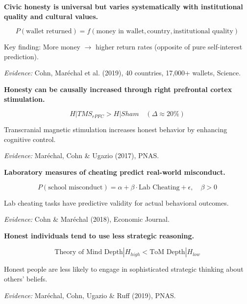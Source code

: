 \begin{tcolorbox}[colback=red!5!white,colframe=red!75!black,title=Axiom MM-3: Civic Honesty Universality with Variation]
\textbf{Civic honesty is universal but varies systematically with institutional quality and cultural values.}

\begin{equation}
P(\text{wallet returned}) = f(\text{money in wallet}, \text{country}, \text{institutional quality})
\end{equation}

Key finding: More money $\rightarrow$ higher return rates (opposite of pure self-interest prediction).

\textit{Evidence:} Cohn, Maréchal et al. (2019), 40 countries, 17,000+ wallets, Science.
\end{tcolorbox}

\begin{tcolorbox}[colback=red!5!white,colframe=red!75!black,title=Axiom MM-4: Neural Basis of Honesty]
\textbf{Honesty can be causally increased through right prefrontal cortex stimulation.}

\begin{equation}
H | TMS_{rPFC} > H | Sham \quad (\Delta \approx 20\%)
\end{equation}

Transcranial magnetic stimulation increases honest behavior by enhancing cognitive control.

\textit{Evidence:} Maréchal, Cohn \& Ugazio (2017), PNAS.
\end{tcolorbox}

\begin{tcolorbox}[colback=red!5!white,colframe=red!75!black,title=Axiom MM-5: Lab-Field Predictive Validity]
\textbf{Laboratory measures of cheating predict real-world misconduct.}

\begin{equation}
P(\text{school misconduct}) = \alpha + \beta \cdot \text{Lab Cheating} + \epsilon, \quad \beta > 0
\end{equation}

Lab cheating tasks have predictive validity for actual behavioral outcomes.

\textit{Evidence:} Cohn \& Maréchal (2018), Economic Journal.
\end{tcolorbox}

\begin{tcolorbox}[colback=red!5!white,colframe=red!75!black,title=Axiom MM-6: Honesty-Cognition Link]
\textbf{Honest individuals tend to use less strategic reasoning.}

\begin{equation}
\text{Theory of Mind Depth} | H_{high} < \text{ToM Depth} | H_{low}
\end{equation}

Honest people are less likely to engage in sophisticated strategic thinking about others' beliefs.

\textit{Evidence:} Maréchal, Cohn, Ugazio \& Ruff (2019), PNAS.
\end{tcolorbox}

